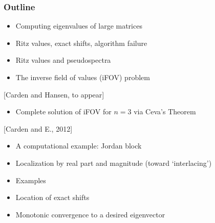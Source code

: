 \begin{frame}
   \frametitle{Outline}

\begin{itemize}
\item Computing eigenvalues of large matrices
\item Ritz values, exact shifts, algorithm failure
\item Ritz values and pseudospectra
\item The inverse field of values (iFOV) problem
\end{itemize}

 {\small [Carden and Hansen, to appear]}
\begin{itemize}
\item Complete solution of iFOV for $n=3$ via Ceva's Theorem
\end{itemize}

 {\small [Carden and E., 2012]}
\begin{itemize}
\item A computational example: Jordan block
\item Localization by real part and magnitude (toward `interlacing')
\item Examples
\end{itemize}

\begin{itemize}
\item Location of exact shifts
\item Monotonic convergence to a desired eigenvector
\end{itemize}

\end{frame}
